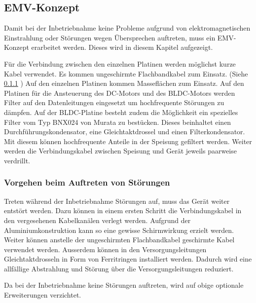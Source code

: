 \subsection{EMV-Konzept}
\label{sec:e_emv}
Damit bei der Inbetriebnahme keine Probleme aufgrund von elektromagnetischen 
Einstrahlung oder Störungen wegen Übersprechen auftreten, muss ein EMV-Konzept 
erarbeitet werden. Dieses wird in diesem Kapitel aufgezeigt. 

\noindent Für die Verbindung zwischen den einzelnen Platinen werden möglichst 
kurze Kabel verwendet. Es kommen ungeschirmte Flachbandkabel zum Einsatz. 
(Siehe \ref{sec:e_emv_opt} ) Auf den einzelnen Platinen 
kommen Masseflächen zum Einsatz. Auf den Platinen für die Ansteuerung des 
DC-Motors und des BLDC-Motors werden Filter auf den Datenleitungen eingesetzt 
um hochfrequente Störungen zu dämpfen. Auf der BLDC-Platine besteht zudem die 
Möglichkeit ein spezielles Filter vom Typ BNX024 von Murata zu bestücken. 
Dieses beinhaltet einen Durchführungskondensator, eine Gleichtaktdrossel und 
einen Filterkondensator. Mit diesem können hochfrequente Anteile in der 
Speisung gefiltert werden. Weiter werden die Verbindungskabel zwischen 
Speisung und Gerät jeweils paarweise verdrillt. 

\subsubsection{Vorgehen beim Auftreten von Störungen}
\label{sec:e_emv_opt}
Treten während der Inbetriebnahme Störungen auf, muss das Gerät weiter 
entstört werden. Dazu können in einem ersten Schritt die Verbindungskabel in 
den vergesehenen Kabelkanälen verlegt werden. Aufgrund der 
Aluminiumkonstruktion kann so eine gewisse Schirmwirkung erzielt werden. 
Weiter können anstelle der ungeschirmten Flachbandkabel geschirmte Kabel 
verwendet werden.  Ausserdem können in den Versorgungsleitungen 
Gleichtaktdrosseln in Form von Ferritringen installiert werden. Dadurch wird 
eine allfällige Abstrahlung und Störung über die Versorgungsleitungen 
reduziert. 

\noindent Da bei der Inbetriebnahme keine Störungen auftreten, wird auf obige 
optionale Erweiterungen verzichtet. 
